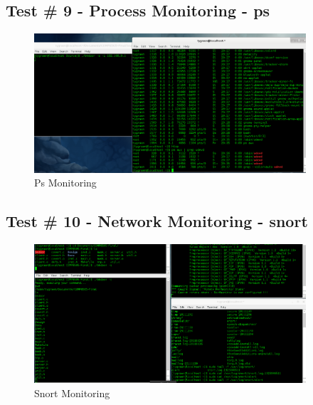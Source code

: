 \documentclass[titlepage]{article}
\begin{document}
\clearpage

\subsection{Test \# 9 - Process Monitoring - ps}

\begin{figure}[htb]                                                                       
  \begin{center}
    \includegraphics[width=0.9\textwidth]{Pictures/ps.png}
  \end{center}
  \caption{Ps Monitoring}
  \label{fig:ps}
\end{figure}

\clearpage

\subsection{Test \# 10 - Network Monitoring - snort}

\begin{figure}[htb]                                                                       
  \begin{center}
    \includegraphics[width=0.9\textwidth]{Pictures/snort.png}
  \end{center}
  \caption{Snort Monitoring}
  \label{fig:snort}
\end{figure}
\end{document}
